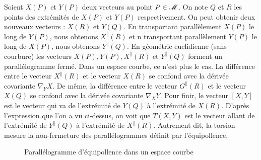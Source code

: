 \documentclass[a4paper,11pt]{report}
\begin{document}
                Soient $X(P)$ et $Y(P)$ deux vecteurs au point $P\in \mathscr{M}$. On note $Q$ et $R$ les points des extrémités de $X(P)$ et $Y(P)$ respectivement. On peut obtenir deux nouveaux vecteurs : $X(R)$ et $Y(Q)$. En transportant parallèlement $X(P)$ le long de $Y(P)$, nous obtenons $X^\parallel(R)$ et n transportant parallèlement $Y(P)$ le long de $X(P)$, nous obtenons $Y^\parallel(Q)$. En géométrie euclidienne (sans courbure) les vecteurs $X(P),Y(P),X^\parallel(R)$ et $Y^\parallel(Q)$ forment un parallélogramme fermé. Dans un espace courbe, ce n'est plus le cas. La différence entre le vecteur $X^\parallel(R)$ et le vecteur $X(R)$ se confond avec la dérivée covariante $\nabla_Y X$. De même, la différence entre le vecteur $G^\parallel(R)$ et le vecteur $X(Q)$ se confond avec la dérivée covariante $\nabla_X Y$. Pour finir, le vecteur $[X,Y]$ est le vecteur qui va de l'extrémité de $Y(Q)$ à l'extrémité de $X(R)$. D'après l'expression que l'on a vu ci-dessus, on voit que $T(X,Y)$ est le vecteur allant de l'extrémité de $Y^\parallel(Q)$ à l'extrémité de $X^\parallel(R)$. Autrement dit, la torsion mesure la non-fermeture des parallélogrammes définit par l'équipollence.
                
                \begin{figure}[H]
                    \centering
                    \caption{Parallélogramme d'équipollence dans un espace courbe}
                \end{figure}
                
\end{document}
